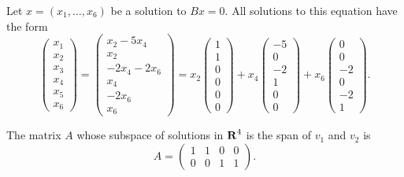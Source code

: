 \soln Let $x = (x_1,\dots,x_6)$ be a solution to $Bx = 0$.  All solutions
to this equation have the form
\[
\left(\begin{array}{r} x_1 \\ x_2 \\ x_3 \\ x_4 \\ x_5 \\ x_6
\end{array}\right) =
\left(\begin{array}{c} x_2 - 5x_4 \\ x_2 \\ -2x_4 - 2x_6 \\ x_4 \\ -2x_6
\\ x_6 \end{array}\right) =
x_2\left(\begin{array}{r} 1 \\ 1 \\ 0 \\ 0 \\ 0 \\ 0 \end{array}\right) +
x_4\left(\begin{array}{r} -5 \\ 0 \\ -2 \\ 1 \\ 0 \\ 0 \end{array}\right) +
x_6\left(\begin{array}{r} 0 \\ 0 \\ -2 \\ 0 \\ -2 \\ 1 \end{array}\right).
\]


\ans The matrix $A$ whose subspace of solutions in $\mbox{$\bf{R}$}^4$ is the span of
$v_1$ and $v_2$ is
\[
A = \left(\begin{array}{rrrr} 1 & 1 & 0 & 0 \\ 0 & 0 & 1 & 1
\end{array}\right).
\]

